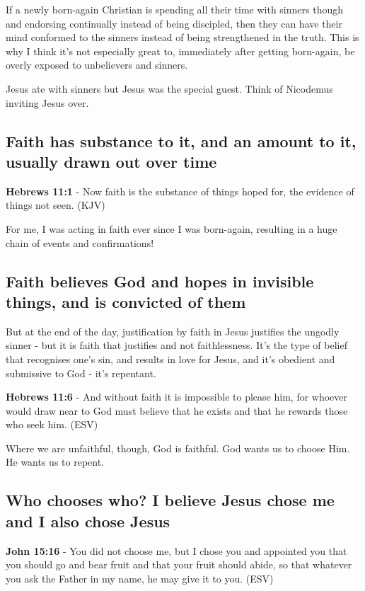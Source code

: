 \documentclass[11pt]{article}
\begin{document}
If a newly born-again Christian is spending all their time with sinners though and endorsing continually instead of being discipled, then they can
have their mind conformed to the sinners instead of being strengthened in the truth. This is why I think it's not especially great to, immediately after getting born-again,
be overly exposed to unbelievers and sinners.

Jesus ate with sinners but Jesus was the special guest. Think of Nicodemus inviting Jesus over.

\subsection{Faith has substance to it, and an amount to it, usually drawn out over time}
\label{sec:org95cf37c}
\textbf{Hebrews 11:1} - Now faith is the substance of things hoped for, the evidence of things not seen. (KJV)

For me, I was acting in faith ever since I was born-again, resulting in a huge chain of events and confirmations!

\subsection{Faith believes God and hopes in invisible things, and is convicted of them}
\label{sec:orgdd4bf45}

But at the end of the day, justification by faith in Jesus justifies the ungodly sinner - but it is faith that justifies and not faithlessness. It's the type of belief that recognises one's sin, and results in love for Jesus, and it's obedient and submissive to God - it's repentant.

\textbf{Hebrews 11:6} - And without faith it is impossible to please him, for whoever would draw near to God must believe that he exists and that he rewards those who seek him. (ESV)

Where we are unfaithful, though, God is faithful. God wants us to choose Him. He wants us to repent.

\subsection{Who chooses who? I believe Jesus chose me and I also chose Jesus}
\label{sec:orgf6b3c95}
\textbf{John 15:16} - You did not choose me, but I chose you and appointed you that you should go and bear fruit and that your fruit should abide, so that whatever you ask the Father in my name, he may give it to you. (ESV)
\end{document}
